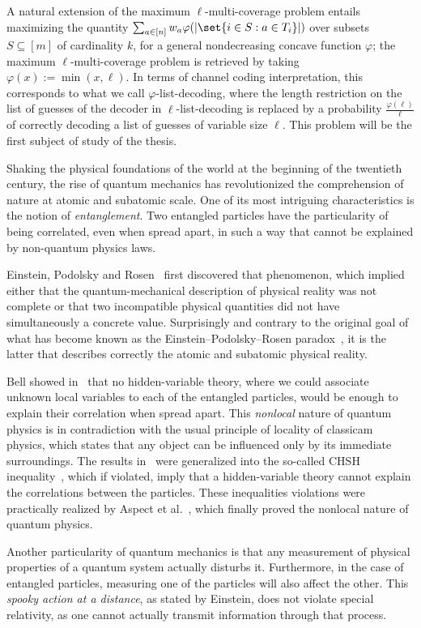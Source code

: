 A natural extension of the maximum $\ell$-multi-coverage problem entails maximizing the quantity $\sum_{a \in [n]}  w_a\varphi(\abs{\set{i \in S : a \in T_i}})$ over subsets $S \subseteq [m]$ of cardinality $k$, for a general nondecreasing concave function $\varphi$; the  maximum $\ell$-multi-coverage problem is retrieved by taking $\varphi(x) := \min(x,\ell)$. In terms of channel coding interpretation, this corresponds to what we call $\varphi$-list-decoding, where the length restriction on the list of guesses of the decoder in $\ell$-list-decoding is replaced by a probability $\frac{\varphi(\ell)}{\ell}$ of correctly decoding a list of guesses of variable size $\ell$. This problem will be the first subject of study of the thesis.

Shaking the physical foundations of the world at the beginning of the twentieth century, the rise of quantum mechanics has revolutionized the comprehension of nature at atomic and subatomic scale. One of its most intriguing characteristics is the notion of \emph{entanglement}. Two entangled particles have the particularity of being correlated, even when spread apart, in such a way that cannot be explained by non-quantum physics laws.

Einstein, Podolsky and Rosen~\cite{EPR35} first discovered that phenomenon, which implied either that the quantum-mechanical description of physical reality was not complete or that two incompatible physical quantities did not have simultaneously a concrete value. Surprisingly and contrary to the original goal of what has become known as the Einstein–Podolsky–Rosen paradox~\cite{EPR35}, it is the latter that describes correctly the atomic and subatomic physical reality.

Bell showed in~\cite{Bell64} that no hidden-variable theory, where we could associate unknown local variables to each of the entangled particles, would be enough to explain their correlation when spread apart. This \emph{nonlocal} nature of quantum physics is in contradiction with the usual principle of locality of classicam physics, which states that any object can be influenced only by its immediate surroundings. The results in~\cite{Bell64} were generalized into the so-called CHSH inequality~\cite{CHSH69}, which if violated, imply that a hidden-variable theory cannot explain the correlations between the particles. These inequalities violations were practically realized by Aspect et al.~\cite{ADG82}, which finally proved the nonlocal nature of quantum physics.

Another particularity of quantum mechanics is that any measurement of physical properties of a quantum system actually disturbs it. Furthermore, in the case of entangled particles, measuring one of the particles will also affect the other. This \emph{spooky action at a distance}, as stated by Einstein, does not violate special relativity, as one cannot actually transmit information through that process. %

